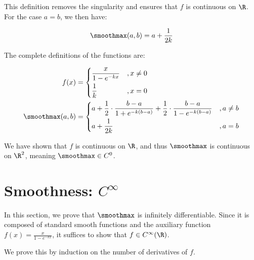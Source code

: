 This definition removes the singularity and ensures that $f$ is continuous on $\R$. For the case $a = b$, we then have:

\begin{align}
    \smoothmax(a, b) = a + \frac{1}{2k}
\end{align}

The complete definitions of the functions are:

\begin{align}
    f(x) &= \begin{dcases}
        \frac{x}{1 - e^{-kx}} &, x \neq 0 \\
        \frac{1}{k} &, x = 0
    \end{dcases} \\
    \smoothmax(a, b) &= \begin{dcases}
        a + \frac{1}{2} \cdot \frac{b - a}{1 + e^{-k(b - a)}} + \frac{1}{2} \cdot \frac{b - a}{1 - e^{-k(b - a)}} &, a \neq b \\
        a + \frac{1}{2k} &, a = b
    \end{dcases}
\end{align}

We have shown that $f$ is continuous on $\R$, and thus $\smoothmax$ is continuous on $\R^2$, meaning $\smoothmax \in C^0$.
\section{Smoothness: $C^\infty$}

In this section, we prove that $\smoothmax$ is infinitely differentiable. Since it is composed of standard smooth functions and the auxiliary function $f(x) = \frac{x}{1 - e^{-kx}}$, it suffices to show that $f \in C^\infty(\R)$.

We prove this by induction on the number of derivatives of $f$.

